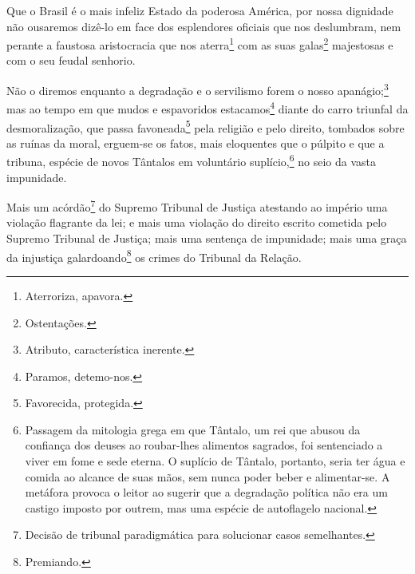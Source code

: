 Que o Brasil é o mais infeliz Estado da poderosa América, por nossa
dignidade não ousaremos dizê-lo em face dos esplendores oficiais que nos
deslumbram, nem perante a faustosa aristocracia que nos
aterra\footnote{Aterroriza, apavora.} com as suas galas\footnote{
  Ostentações.} majestosas e com o seu feudal senhorio.

Não o diremos enquanto a degradação e o servilismo forem o nosso
apanágio;\footnote{Atributo, característica inerente.} mas ao tempo em
que mudos e espavoridos estacamos\footnote{Paramos, detemo-nos.}
diante do carro triunfal da desmoralização, que passa
favoneada\footnote{Favorecida, protegida.} pela religião e pelo
direito, tombados sobre as ruínas da moral, erguem-se os fatos, mais
eloquentes que o púlpito e que a tribuna, espécie de novos Tântalos em
voluntário suplício,\footnote{Passagem da mitologia grega em que
  Tântalo, um rei que abusou da confiança dos deuses ao roubar-lhes
  alimentos sagrados, foi sentenciado a viver em fome e sede eterna. O
  suplício de Tântalo, portanto, seria ter água e comida ao alcance de
  suas mãos, sem nunca poder beber e alimentar-se. A metáfora provoca o
  leitor ao sugerir que a degradação política não era um castigo imposto
  por outrem, mas uma espécie de autoflagelo nacional.} no seio da
vasta impunidade.

Mais um acórdão\footnote{Decisão de tribunal paradigmática
  para solucionar casos semelhantes.} do Supremo Tribunal de Justiça
atestando ao império uma violação flagrante da lei; e mais uma violação
do direito escrito cometida pelo Supremo Tribunal de Justiça; mais uma
sentença de impunidade; mais uma graça da injustiça
galardoando\footnote{Premiando.} os crimes do Tribunal da Relação.

